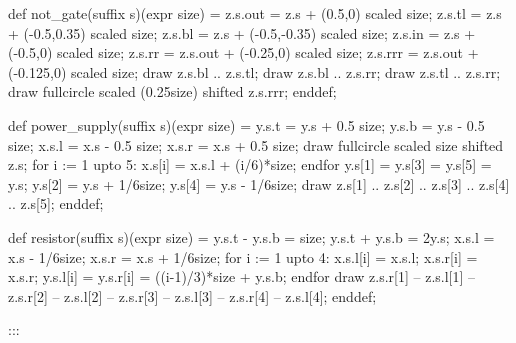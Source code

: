 def not_gate(suffix s)(expr size) =
 z.s.out = z.s + (0.5,0) scaled size;
 z.s.tl = z.s + (-0.5,0.35) scaled size;
 z.s.bl = z.s + (-0.5,-0.35) scaled size;
 z.s.in = z.s + (-0.5,0) scaled size;
 z.s.rr = z.s.out + (-0.25,0) scaled size;
 z.s.rrr = z.s.out + (-0.125,0) scaled size;
 draw z.s.bl .. z.s.tl;
 draw z.s.bl .. z.s.rr;
 draw z.s.tl .. z.s.rr;
 draw fullcircle scaled (0.25size) shifted z.s.rrr;
enddef;

def power_supply(suffix s)(expr size) =
 y.s.t = y.s + 0.5 size; y.s.b = y.s - 0.5 size;
 x.s.l = x.s - 0.5 size; x.s.r = x.s + 0.5 size;
 draw fullcircle scaled size shifted z.s;
 for i := 1 upto 5: x.s[i] = x.s.l + (i/6)*size; endfor
 y.s[1] = y.s[3] = y.s[5] = y.s;
 y.s[2] = y.s + 1/6size; y.s[4] = y.s - 1/6size;
 draw z.s[1] .. z.s[2] .. z.s[3] .. z.s[4] .. z.s[5];
enddef;

def resistor(suffix s)(expr size) =
 y.s.t - y.s.b = size; y.s.t + y.s.b = 2y.s;
 x.s.l = x.s - 1/6size; x.s.r = x.s + 1/6size;
 for i := 1 upto 4:
  x.s.l[i] = x.s.l; x.s.r[i] = x.s.r;
  y.s.l[i] = y.s.r[i] = ((i-1)/3)*size + y.s.b;
 endfor
 draw z.s.r[1] -- z.s.l[1] -- z.s.r[2] -- z.s.l[2] --
           z.s.r[3] -- z.s.l[3] -- z.s.r[4] -- z.s.l[4];
enddef;

:::

\def\MTbeginfigure(#1,#2);{\MTbeginchar(#1pt,#2pt,0pt);}

\def\MTendfigure"#1"#2;{\MTendchar; %
 $$\predisplaypenalty=50 \displaywidth=\hsize \displayindent=0pt
 {\def\cr{\string\cr\space}\def\cite{\string\cite}\def|{\string\aut\space}%
  \def\person{\string\person}\def\Syntax{\string\Syntax}%
  \pdflabel\toc9{#1\string|#2}}\global\advance\d@stno1
 \vcenter{\hbox{\box\MTbox}}\qquad
 \vcenter{\hbox{\pdfgoto{\vbox{\bf\halign{\hfil##\hfil\cr#1\crcr}}%
  }{\number\d@stno}}}$$}

\def\MTendfigureX"#1"#2;{\MTendchar; %
 $$\predisplaypenalty=50 \displaywidth=\hsize \displayindent=0pt
 {\def\cr{\string\cr\space}\def\cite{\string\cite}\def|{\string\aut\space}%
  \def\person{\string\person}\def\Syntax{\string\Syntax}%
  \pdflabel\toc9{#1\string|#2}}\global\advance\d@stno1
 \vcenter{\hbox{\box\MTbox}}\hss %
 \vcenter{\hbox{\pdfgoto{\vbox{\bf\halign{\hfil##\hfil\cr#1\crcr}}%
  }{\number\d@stno}}}$$}


\def\uncatcodeall{\def\do##1{\catcode`##1=12 }\dospecials\dohigh}
\def\iverb#1{\begingroup\uncatcodeall\obeyspaces\obeylines\d@iverb#1}
\def\d@iverb#1#2{\def\next##1#2{\immediate\write#1{##1}\endgroup}\next}
\def\wverb#1{\begingroup\uncatcodeall\obeyspaces\obeylines\d@wverb#1}
\def\d@wverb#1#2{\def\next##1#2{\write#1{##1}\endgroup}\next}

